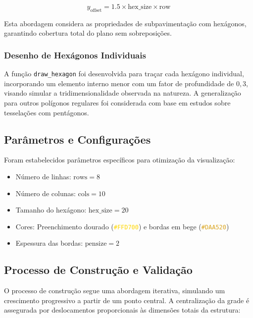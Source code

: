 \documentclass[12pt,a4paper,oneside]{extarticle}
\begin{document}
\begin{equation}
y_{\text{offset}} = 1.5 \times \text{hex\_size} \times \text{row}
\end{equation}

Esta abordagem considera as propriedades de subpavimentação com hexágonos, garantindo cobertura total do plano sem sobreposições.

\subsubsection{Desenho de Hexágonos Individuais}

A função \texttt{draw\_hexagon} foi desenvolvida para traçar cada hexágono individual, incorporando um elemento interno menor com um fator de profundidade de $0,3$, visando simular a tridimensionalidade observada na natureza. A generalização para outros polígonos regulares foi considerada com base em estudos sobre tesselações com pentágonos.

\subsection{Parâmetros e Configurações}

Foram estabelecidos parâmetros específicos para otimização da visualização:

\begin{itemize}
    \item Número de linhas: $\mathrm{rows} = 8$
    \item Número de colunas: $\mathrm{cols} = 10$  
    \item Tamanho do hexágono: $\mathrm{hex\_size} = 20$
    \item Cores: Preenchimento dourado (\textcolor[HTML]{FFD700}{\texttt{\#FFD700}}) e bordas em bege (\textcolor[HTML]{DAA520}{\texttt{\#DAA520}})
    \item Espessura das bordas: $\mathrm{pensize} = 2$
\end{itemize}

\subsection{Processo de Construção e Validação}

O processo de construção segue uma abordagem iterativa, simulando um crescimento progressivo a partir de um ponto central. A centralização da grade é assegurada por deslocamentos proporcionais às dimensões totais da estrutura:
\end{document}
